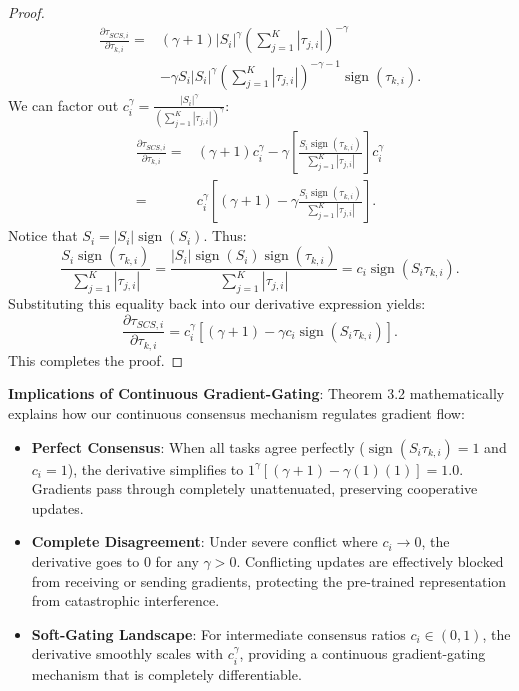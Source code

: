 \documentclass{article}
\theoremstyle{plain}
\theoremstyle{definition}
\theoremstyle{remark}
\begin{document}
\begin{proof}
\begin{align*}
    \frac{\partial \tau_{SCS, i}}{\partial \tau_{k, i}} ={}& (\gamma+1) |S_i|^\gamma \left( \sum_{j=1}^K |\tau_{j, i}| \right)^{-\gamma} \\
    & - \gamma S_i |S_i|^\gamma \left( \sum_{j=1}^K |\tau_{j, i}| \right)^{-\gamma-1} \operatorname{sign}(\tau_{k, i}).
\end{align*}
We can factor out $c_i^\gamma = \frac{|S_i|^\gamma}{\left(\sum_{j=1}^K |\tau_{j, i}|\right)^\gamma}$:
\begin{align*}
    \frac{\partial \tau_{SCS, i}}{\partial \tau_{k, i}} ={}& (\gamma+1) c_i^\gamma - \gamma \left[ \frac{S_i \operatorname{sign}(\tau_{k, i})}{\sum_{j=1}^K |\tau_{j, i}|} \right] c_i^\gamma \\
    ={}& c_i^\gamma \left[ (\gamma+1) - \gamma \frac{S_i \operatorname{sign}(\tau_{k, i})}{\sum_{j=1}^K |\tau_{j, i}|} \right].
\end{align*}
Notice that $S_i = |S_i| \operatorname{sign}(S_i)$. Thus:
\begin{equation*}
    \frac{S_i \operatorname{sign}(\tau_{k, i})}{\sum_{j=1}^K |\tau_{j, i}|} = \frac{|S_i| \operatorname{sign}(S_i) \operatorname{sign}(\tau_{k, i})}{\sum_{j=1}^K |\tau_{j, i}|} = c_i \operatorname{sign}(S_i \tau_{k, i}).
\end{equation*}
Substituting this equality back into our derivative expression yields:
\begin{equation*}
    \frac{\partial \tau_{SCS, i}}{\partial \tau_{k, i}} = c_i^\gamma \left[ (\gamma+1) - \gamma c_i \operatorname{sign}(S_i \tau_{k, i}) \right].
\end{equation*}
This completes the proof.
\end{proof}

\textbf{Implications of Continuous Gradient-Gating}:
Theorem 3.2 mathematically explains how our continuous consensus mechanism regulates gradient flow:
\begin{itemize}
    \item \textbf{Perfect Consensus}: When all tasks agree perfectly ($\operatorname{sign}(S_i \tau_{k, i}) = 1$ and $c_i = 1$), the derivative simplifies to $1^\gamma [(\gamma+1) - \gamma(1)(1)] = 1.0$. Gradients pass through completely unattenuated, preserving cooperative updates.
    \item \textbf{Complete Disagreement}: Under severe conflict where $c_i \to 0$, the derivative goes to $0$ for any $\gamma > 0$. Conflicting updates are effectively blocked from receiving or sending gradients, protecting the pre-trained representation from catastrophic interference.
    \item \textbf{Soft-Gating Landscape}: For intermediate consensus ratios $c_i \in (0, 1)$, the derivative smoothly scales with $c_i^\gamma$, providing a continuous gradient-gating mechanism that is completely differentiable.
\end{itemize}
\end{document}
